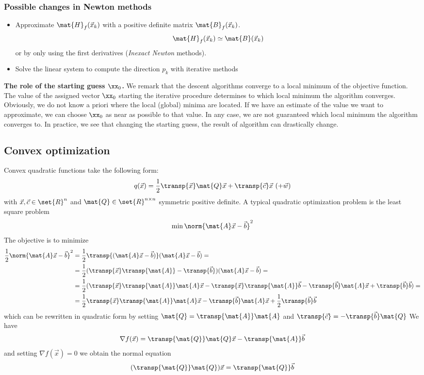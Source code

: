 \subsubsection{Possible changes in Newton methods}

\begin{itemize}
    \item 
 Approximate 
$\mat{H}_f(\vec{x}_k)$ with a positive definite matrix $\mat{B}_f(\vec{x}_k)$.
$$ \mat{H}_f(\vec{x}_k) \simeq \mat{B}(\vec{x}_k) $$ or by only using the first derivatives (\textit{Inexact Newton} methods).
\item Solve the linear system to compute the direction $p_k$ with iterative methods
\end{itemize}

\textbf{The role of the starting guess $\xx_0$.} We remark that the descent algorithms converge to a local minimum of the objective function. The value of the assigned vector $\xx_0$ starting the iterative procedure determines to which local minimum the algorithm converges. Obviously, we do not know a priori where the local (global) minima are located. If we have an estimate of the value we want to approximate, we can choose $\xx_0$ as near as possible to that value. In any case, we are not guaranteed which local minimum the algorithm converges to. In practice, we see that changing the starting guess, the result of algorithm can drastically change.

\subsection{Convex optimization}
Convex quadratic functions take the following form:
$$ q(\vec{x}) = \frac{1}{2}\transp{\vec{x}}\mat{Q}\vec{x} + \transp{\vec{c}}\vec{x}\ (+ \vec{w}) $$
with $\vec{x}, \vec{c} \in \set{R}^n$ and $\mat{Q} \in \set{R}^{n \times n}$ symmetric positive definite. A typical quadratic optimization problem is the least square problem
$$ \min{\norm{\mat{A}\vec{x} - \vec{b}}^2} $$
The objective is to minimize
$$
    \begin{aligned}
        \frac{1}{2}\norm{\mat{A}\vec{x} - \vec{b}}^2 &= \frac{1}{2}\transp{(\mat{A}\vec{x} - \vec{b})}(\mat{A}\vec{x} - \vec{b}) =\\
        &= \frac{1}{2}(\transp{\vec{x}}\transp{\mat{A}} - \transp{\vec{b}})(\mat{A}\vec{x} - \vec{b}) =\\
        &= \frac{1}{2}(\transp{\vec{x}}\transp{\mat{A}}\mat{A}\vec{x} - \transp{\vec{x}}\transp{\mat{A}}\vec{b} - \transp{\vec{b}}\mat{A}\vec{x} + \transp{\vec{b}}\vec{b}) =\\
        &= \frac{1}{2}\transp{\vec{x}}\transp{\mat{A}}\mat{A}\vec{x} - \transp{\vec{b}}\mat{A}\vec{x} + \frac{1}{2}\transp{\vec{b}}\vec{b}
    \end{aligned}
$$
which can be rewritten in quadratic form by setting $\mat{Q} = \transp{\mat{A}}\mat{A}$ and $\transp{\vec{c}} = -\transp{\vec{b}}\mat{Q}$
We have
$$ \nabla{f}(\vec{x}) = \transp{\mat{Q}}\mat{Q}\vec{x} - \transp{\mat{A}}\vec{b} $$
and setting $\nabla{f}(\vec{x}) = 0$ we obtain the normal equation
$$ (\transp{\mat{Q}}\mat{Q})\vec{x} = \transp{\mat{Q}}\vec{b} $$

